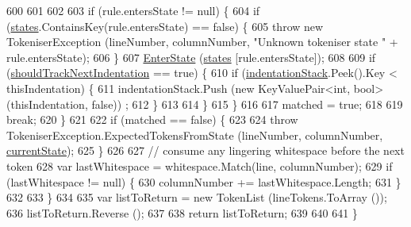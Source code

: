 \begin{DoxyCode}
600 
601 
602 
603                     \textcolor{keywordflow}{if} (rule.entersState != null) \{
604                         \textcolor{keywordflow}{if} (\hyperlink{a00061_a2c65c0ba90f973e459583badefef216a}{states}.ContainsKey(rule.entersState) == \textcolor{keyword}{false}) \{
605                             \textcolor{keywordflow}{throw} \textcolor{keyword}{new} TokeniserException (lineNumber, columnNumber, \textcolor{stringliteral}{"Unknown tokeniser
       state "} + rule.entersState);
606                         \}
607                         \hyperlink{a00061_ad3ef08f822b310d9864774b057b96995}{EnterState} (\hyperlink{a00061_a2c65c0ba90f973e459583badefef216a}{states} [rule.entersState]);
608 
609                         \textcolor{keywordflow}{if} (\hyperlink{a00061_ac670aac2245cbd4694dfbd5b69313218}{shouldTrackNextIndentation} == \textcolor{keyword}{true}) \{
610                             \textcolor{keywordflow}{if} (\hyperlink{a00061_a6631a1b1a9109258ab18927e7587ff9b}{indentationStack}.Peek().Key < thisIndentation) \{
611                                 indentationStack.Push (\textcolor{keyword}{new} KeyValuePair<int, bool>(thisIndentation, \textcolor{keyword}{false}))
      ;
612                             \}
613                                 
614                         \}
615                     \}
616 
617                     matched = \textcolor{keyword}{true};
618 
619                     \textcolor{keywordflow}{break};
620                 \}
621 
622                 \textcolor{keywordflow}{if} (matched == \textcolor{keyword}{false}) \{
623 
624                     \textcolor{keywordflow}{throw} TokeniserException.ExpectedTokensFromState (lineNumber, columnNumber, 
      \hyperlink{a00061_ac90b7dce8103425a148f9e8588f14137}{currentState});
625                 \}
626 
627                 \textcolor{comment}{// consume any lingering whitespace before the next token}
628                 var lastWhitespace = whitespace.Match(line, columnNumber);
629                 \textcolor{keywordflow}{if} (lastWhitespace != null) \{
630                     columnNumber += lastWhitespace.Length;
631                 \}
632 
633             \}
634 
635             var listToReturn = \textcolor{keyword}{new} TokenList (lineTokens.ToArray ());
636             listToReturn.Reverse ();
637 
638             \textcolor{keywordflow}{return} listToReturn;
639 
640 
641         \}
\end{DoxyCode}


